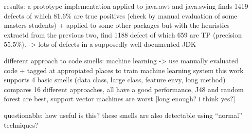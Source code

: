 results:
a prototype implementation applied to java.awt and java.swing finds 1419 defects of which 81.6\% are true positives (check by manual evaluation of some masters students)
+ applied to some other packages but with the heuristics extractd from the previous two, find 1188 defect of which 659 are TP (precision 55.5\%).
-> lots of defects in a supposedly well documented JDK

\cite{fontana2016comparing}
different approach to code smells: machine learning
-> use manually evaluated code + tagged at appropiated places to train machine learning system
this work supports 4 basic smells (data class, large class, feature envy, long method)
compares 16 different approaches, all have a good performance, J48 and random forest are best, support vector machines are worst
[long enough? i think yes?]

questionable: how useful is this? these smells are also detectable using ``normal'' techniques?
